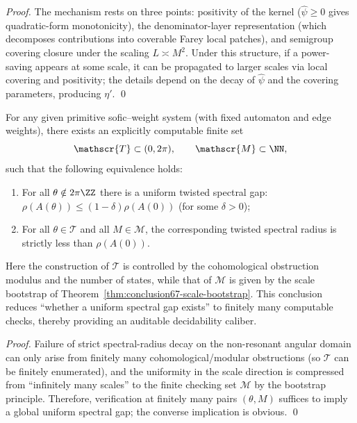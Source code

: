 \begin{proof}
The mechanism rests on three points: positivity of the kernel (\(\widehat\psi\ge 0\) gives quadratic-form monotonicity), the denominator-layer representation (which decomposes contributions into coverable Farey local patches), and semigroup covering closure under the scaling \(L\asymp M^2\).
Under this structure, if a power-saving appears at some scale, it can be propagated to larger scales via local covering and positivity; the details depend on the decay of \(\widehat\psi\) and the covering parameters, producing \(\eta'\). \qed
\end{proof}

\begin{theorem}\label{thm:conclusion68-finite-verification}
For any given primitive sofic--weight system (with fixed automaton and edge weights), there exists an explicitly computable finite set
\[
\mathscr{T}\subset(0,2\pi),\qquad \mathscr{M}\subset\NN,
\]
such that the following equivalence holds:
\begin{enumerate}
  \item For all \(\theta\notin 2\pi\ZZ\) there is a uniform twisted spectral gap: \(\rho(A(\theta))\le (1-\delta)\rho(A(0))\) (for some \(\delta>0\));
  \item For all \(\theta\in\mathscr{T}\) and all \(M\in\mathscr{M}\), the corresponding twisted spectral radius is strictly less than \(\rho(A(0))\).
\end{enumerate}
Here the construction of \(\mathscr{T}\) is controlled by the cohomological obstruction modulus and the number of states, while that of \(\mathscr{M}\) is given by the scale bootstrap of Theorem~\ref{thm:conclusion67-scale-bootstrap}.
This conclusion reduces ``whether a uniform spectral gap exists'' to finitely many computable checks, thereby providing an auditable decidability caliber.
\end{theorem}

\begin{proof}
Failure of strict spectral-radius decay on the non-resonant angular domain can only arise from finitely many cohomological/modular obstructions (so \(\mathscr{T}\) can be finitely enumerated), and the uniformity in the scale direction is compressed from ``infinitely many scales'' to the finite checking set \(\mathscr{M}\) by the bootstrap principle.
Therefore, verification at finitely many pairs \((\theta,M)\) suffices to imply a global uniform spectral gap; the converse implication is obvious. \qed
\end{proof}
